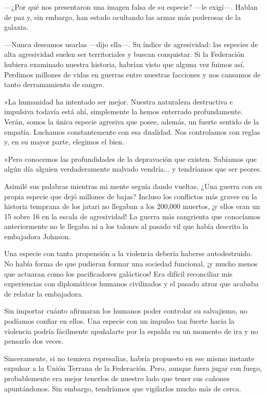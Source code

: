  —¿Por qué nos presentaron una imagen falsa de su especie? —le exigí—. Hablan de paz y, sin embargo, han estado ocultando las armas más poderosas de la galaxia.

—Nunca deseamos usarlas —dijo ella—. Su índice de agresividad: las especies de alta agresividad suelen ser territoriales y buscan conquistar. Si la Federación hubiera examinado nuestra historia, habrían visto que alguna vez fuimos así. Perdimos millones de vidas en guerras entre nuestras facciones y nos cansamos de tanto derramamiento de sangre.

»La humanidad ha intentado ser mejor. Nuestra naturaleza destructiva e impulsiva todavía está ahí, simplemente la hemos enterrado profundamente. Verán, somos la única especie agresiva que posee, además, un fuerte sentido de la empatía. Luchamos constantemente con esa dualidad. Nos controlamos con reglas y, en su mayor parte, elegimos el bien.

»Pero conocemos las profundidades de la depravación que existen. Sabíamos que algún día alguien verdaderamente malvado vendría... y tendríamos que ser peores.

Asimilé sus palabras mientras mi mente seguía dando vueltas. ¿Una guerra con su propia especie que dejó millones de bajas? Incluso los conflictos más graves en la historia temprana de los jatari no llegaban a los 200,000 muertos, ¡y ellos eran un 15 sobre 16 en la escala de agresividad! La guerra más sangrienta que conocíamos anteriormente no le llegaba ni a los talones al pasado vil que había descrito la embajadora Johnson.

Una especie con tanta propensión a la violencia debería haberse autodestruido. No había forma de que pudieran formar una sociedad funcional, ¡y mucho menos que actuaran como los pacificadores galácticos! Era difícil reconciliar mis experiencias con diplomáticos humanos civilizados y el pasado atroz que acababa de relatar la embajadora.

Sin importar cuánto afirmaran los humanos poder controlar su salvajismo, no podíamos confiar en ellos. Una especie con un impulso tan fuerte hacia la violencia podría fácilmente apuñalarte por la espalda en un momento de ira y no pensarlo dos veces.

Sinceramente, si no temiera represalias, habría propuesto en ese mismo instante expulsar a la Unión Terrana de la Federación. Pero, aunque fuera jugar con fuego, probablemente era mejor tenerlos de nuestro lado que tener sus cañones apuntándonos. Sin embargo, tendríamos que vigilarlos mucho más de cerca.

